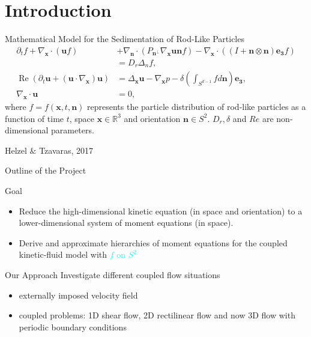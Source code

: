 \section{Introduction}

\begin{frame}{Mathematical Model for the Sedimentation of Rod-Like Particles}
	\scriptsize
{}
\begin{align*}
\partial_t f+ \nabla_{\boldsymbol{x}} \cdot(\boldsymbol{u} f) & +\nabla_{\boldsymbol{n}} \cdot\left(P_{\boldsymbol{n}^{\perp}} \nabla_{\boldsymbol{x}} \boldsymbol{u} \boldsymbol{n} f\right)- \nabla_{\boldsymbol{x}} \cdot\left((I+\boldsymbol{n} \otimes \boldsymbol{n}) \boldsymbol{e_3} f\right) \\
	& =D_r \Delta_n f, \\
	\operatorname{Re}\left(\partial_t \boldsymbol{u}+\left(\boldsymbol{u} \cdot \nabla_{\boldsymbol{x}}\right) \boldsymbol{u}\right) & =\Delta_{\boldsymbol{x}} \boldsymbol{u}-\nabla_{\boldsymbol{x}} p-\delta \left(\int_{S^{d-1}} f d \boldsymbol{n} \right) \boldsymbol{e_3}, \\
	\nabla_{\boldsymbol{x}} \cdot \boldsymbol{u} & =0,
\end{align*}
where $f = f(\boldsymbol{x}, t, \boldsymbol{n})$ represents the particle distribution of rod-like particles as a function of time $t$, space $\boldsymbol{x} \in \mathbb{R}^3$ and orientation $\boldsymbol{n} \in  S^2$. 
$D_r, \delta$ and $Re$ are non-dimensional parameters.
\begin{beamercolorbox}[sep=1em,wd=\linewidth,right]{}
	\tiny{Helzel $\&$ Tzavaras, 2017}
\end{beamercolorbox}
\end{frame}

\begin{frame}{Outline of the Project}
	\scriptsize
	\begin{block}{Goal}
		\begin{itemize}
			\item Reduce the high-dimensional kinetic equation (in space and orientation) to a lower-dimensional system of moment equations (in space).
			\item Derive and approximate hierarchies of moment equations for the coupled kinetic-fluid model with \textcolor{cyan}{$f$ on $S^2$}
		\end{itemize}
	\end{block}
    \pause
	\begin{block}{Our Approach}
		 Investigate different coupled flow situations
		\begin{itemize}
			\item externally imposed velocity field
            \item coupled problems: 1D shear flow, 2D rectilinear flow and
             \pause now 3D flow with periodic boundary conditions
		\end{itemize}
    \end{block}
\end{frame}

